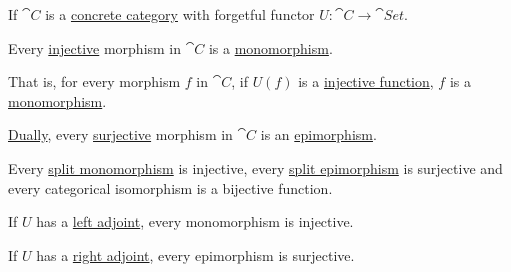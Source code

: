 \begin{proposition}\label{thm:concrete_category_function_invertibility}
  If \( \cat{C} \) is a \hyperref[def:concrete_category]{concrete category} with forgetful functor \( U: \cat{C} \to \cat{Set} \).

  \begin{thmenum}
     Every \hyperref[def:set_valued_map/empty]{} \hyperref[def:function_invertibility/injective]{injective} morphism in \( \cat{C} \) is a \hyperref[def:morphism_invertibility/left_cancellative]{monomorphism}.

    That is, for every morphism \( f \) in \( \cat{C} \), if \( U(f) \) is a \hyperref[def:set_valued_map/empty]{} \hyperref[def:function_invertibility/injective]{injective function}, \( f \) is a \hyperref[def:morphism_invertibility/left_cancellative]{monomorphism}.

     \hyperref[thm:categorical_principle_of_duality]{Dually}, every \hyperref[def:function_invertibility/surjective]{surjective} morphism in \( \cat{C} \) is an \hyperref[def:morphism_invertibility/right_cancellative]{epimorphism}.

     Every \hyperref[def:morphism_invertibility/left_invertible]{split monomorphism} is injective, every \hyperref[def:morphism_invertibility/right_cancellative]{split epimorphism} is surjective and every categorical isomorphism is a bijective function.

     If \( U \) has a \hyperref[def:category_adjunction]{left adjoint}, every monomorphism is injective.

     If \( U \) has a \hyperref[def:category_adjunction]{right adjoint}, every epimorphism is surjective.
  \end{thmenum}
\end{proposition}
